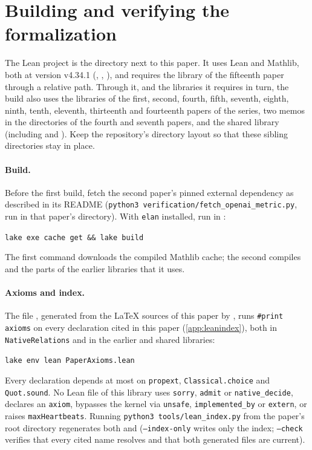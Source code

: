 \section{Building and verifying the formalization}\label{app:verification}

The Lean project is the directory  next to this paper. It uses Lean and Mathlib, both at version v4.34.1
(, , ), and requires the library of the fifteenth
paper~\cite{HighRate2026} through a relative path. Through it, and the libraries it requires in turn, the build also uses the libraries
of the first, second, fourth, fifth, seventh, eighth, ninth, tenth, eleventh, thirteenth and fourteenth papers of the series, two memos
in the directories of the fourth and seventh papers, and the shared  library (including
 and ). Keep the repository's
directory layout so that these sibling directories stay in place.

\paragraph{Build.} Before the first build, fetch the second paper's pinned external dependency as described in its README
(\texttt{python3 verification/fetch\_openai\_metric.py}, run in that paper's directory). With \texttt{elan} installed, run in
:
\begin{center}
\texttt{lake exe cache get \&\& lake build}
\end{center}
The first command downloads the compiled Mathlib cache; the second compiles  and the parts of the earlier
libraries that it uses.

\paragraph{Axioms and index.} The file , generated from the \LaTeX{} sources of this paper by
, runs \texttt{\#print axioms} on every declaration cited in this paper (\cref{app:leanindex}), both in
\texttt{NativeRelations} and in the earlier and shared libraries:
\begin{center}
\texttt{lake env lean PaperAxioms.lean}
\end{center}
Every declaration depends at most on \texttt{propext}, \texttt{Classical.choice} and \texttt{Quot.sound}. No Lean file of this
library uses \texttt{sorry}, \texttt{admit} or \texttt{native\_decide}, declares an \texttt{axiom}, bypasses the kernel via
\texttt{unsafe}, \texttt{implemented\_by} or \texttt{extern}, or raises \texttt{maxHeartbeats}. Running
\texttt{python3 tools/lean\_index.py} from the paper's root directory regenerates both  and
 (\texttt{--index-only} writes only the index; \texttt{--check} verifies that every cited name
resolves and that both generated files are current).

